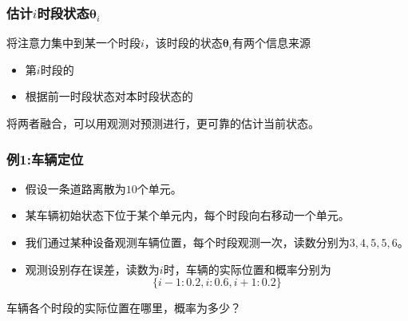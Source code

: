 \documentclass[14pt]{beamer}
\renewcommand{\vec}[1]{\bm{#1}}
\newcommand{\Vt}{\vec{\theta}}
\let\emph\relax %
\begin{document}
\begin{frame}
  \frametitle{估计$i$时段状态$\Vt_i$}
  将注意力集中到某一个时段$i$，该时段的状态$\Vt_i$有两个信息来源
  \begin{itemize}
    \item 第$i$时段的\emph{观测}
    \item 根据前一时段状态对本时段状态的\emph{预测}
  \end{itemize}
  将两者融合，可以用观测对预测进行\emph{修正}，更可靠的估计当前状态。
\end{frame}

\begin{frame}
  \frametitle{例1:车辆定位}
  \begin{itemize}
    \item 假设一条道路离散为$10$个单元。
    \item 某车辆初始状态下位于某个单元内，每个时段向右移动一个单元。
    \item 我们通过某种设备观测车辆位置，每个时段观测一次，读数分别为${3,4,5,5,6}$。
    \item 观测设别存在误差，读数为$i$时，车辆的实际位置和概率分别为
    $$\{i-1:0.2,i:0.6,i+1:0.2\}$$
  \end{itemize}

  车辆各个时段的实际位置在哪里，概率为多少？
\end{frame}
\end{document}
